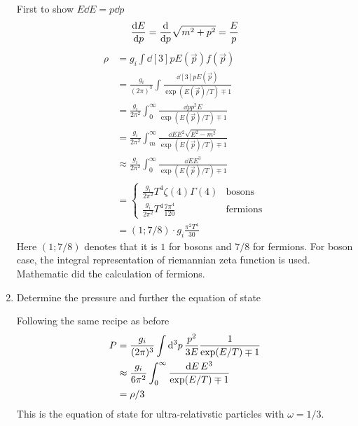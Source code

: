 \begin{enumerate}[label=(\alph*)]
         First to show $E\dd{E}= p \dd{p}$
         \begin{align*}
            \dv{E}{p} = \dv{p} \sqrt{m^2 + p^2} = \frac{E}{p}
         \end{align*}
         \begin{align*}
            \rho &= g_i \int \dd[3]{p} E(\vec{p})f(\vec{p}) \\
                 &= \frac{g_i}{(2\pi)^3} \int \frac{\dd[3]{p} E(\vec{p})}{\exp(E(\vec{p})/T) \mp 1} \\
                 &= \frac{g_i}{2\pi^2} \int_0^\infty \frac{\dd{p} p^2 E}{\exp(E(\vec{p})/T) \mp 1} \\
                 &= \frac{g_i}{2\pi^2} \int_m^\infty \frac{\dd{E} E^2 \sqrt{E^2 - m^2}}{\exp(E(\vec{p})/T) \mp 1} \\ 
                 &\approx \frac{g_i}{2\pi^2} \int_0^\infty \frac{\dd{E} E^3 }{\exp(E(\vec{p})/T) \mp 1} \\  
                 &= 
                 \begin{cases}
                    \frac{g_i}{2\pi^2} T^4 \zeta(4) \Gamma(4) & \text{bosons}\\
                    \frac{g_i}{2\pi^2} T^4 \frac{7\pi^4}{120} & \text{fermions}
                 \end{cases}\\
                 &= \left(1; 7/8 \right) \cdot g_i \frac{\pi^2 T^4}{30}
         \end{align*}
         Here $(1; 7/8)$ denotes that it is $1$ for bosons and $7/8$ for fermions. For boson case, the integral representation of riemannian zeta function is used. Mathematic did the calculation of fermions.
      \item Determine the pressure and further the equation of state
         
         Following the same recipe as before
         \begin{align}
            P &= \frac{g_i}{(2\pi)^3} \int \dd[3]{p} \frac{p^2}{3 E}  \frac{1}{\exp(E/T) \mp 1} \notag \\
              &\approx \frac{g_i}{6\pi^2} \int_0^\infty \frac{\dd{E} E^3}{\exp(E/T) \mp 1} \notag \\
              &= \rho /3
         \end{align}
         This is the  equation of state for ultra-relativstic particles with $\omega = 1/3$.
\end{enumerate}

